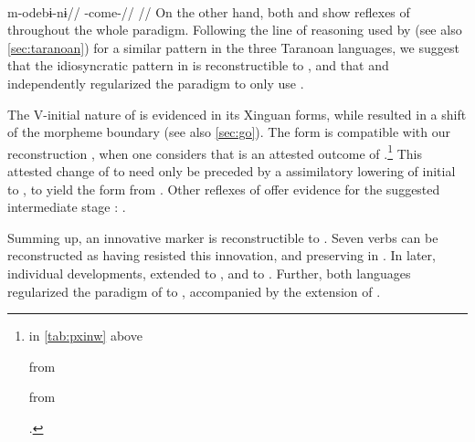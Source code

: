 \arara \parencite[][150]{alves2017arara}\\
\begingl
\gla m-odebɨ-nɨ//
\glb {}-come-//
\glft {}//
\endgl
\xe
%
On the other hand, both \ikpeng and \bakairi show reflexes of  throughout the whole paradigm.
Following the line of reasoning used by \textcite[114]{meira1998proto} (see also \cref{sec:taranoan}) for a similar pattern in the three Taranoan languages, we suggest that the idiosyncratic pattern in \arara is reconstructible to \PPek, and that \bakairi and \ikpeng independently regularized the paradigm to only use .

The V-initial nature of  is evidenced in its Xinguan forms, while \bakairi {} resulted in a shift of the morpheme boundary (see also \cref{sec:go}).
The \ikpeng form  is compatible with our reconstruction , when one considers that \ikpeng {} is an attested outcome of .\footnote{\begin{inlinelist}
 \item {}  in \cref{tab:pxinw} above
 \item {}  \parencite[24]{ikpengpacheco2001} from \PC {} \parencite[12]{gildea2007greenberg}
 \item {}  \parencite[98]{ikpengpacheco2001} from \PC {}
 \end{inlinelist}.}
This attested change of  to  need only be preceded by a assimilatory lowering of initial  to , to yield the form  from .
Other \ikpeng reflexes of  offer evidence for the suggested intermediate stage :   \parencite[25]{ikpengpacheco2001}.

Summing up, an innovative  marker  is reconstructible to \PPek.
Seven verbs can be reconstructed as having resisted this innovation, and preserving   in \PPek.
In later, individual developments, \bakairi extended  to , and \ikpeng to .
Further, both languages regularized the paradigm of  to , accompanied by the extension of .

